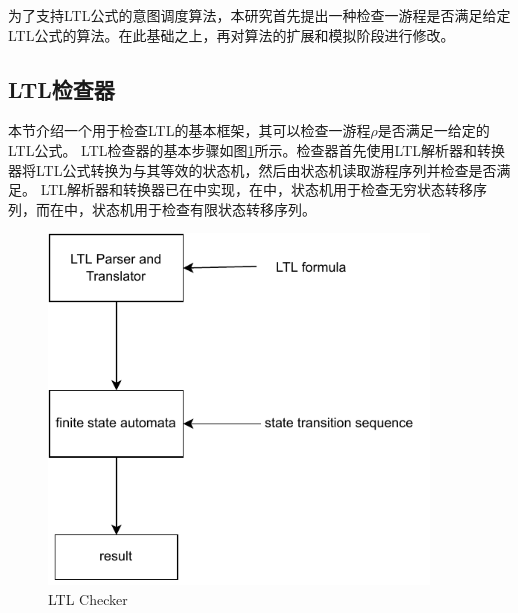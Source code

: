 为了支持LTL公式的意图调度算法，本研究首先提出一种检查一游程是否满足给定LTL公式的算法。在此基础之上，再对\SA 算法的扩展和模拟阶段进行修改。

\subsection{LTL检查器}
本节介绍一个用于检查LTL的基本框架，其可以检查一游程$\rho$是否满足一给定的LTL公式。
LTL检查器的基本步骤如图\ref{fig:translator}所示。检查器首先使用LTL解析器和转换器将LTL公式转换为与其等效的状态机，然后由状态机读取游程序列并检查是否满足。
LTL解析器和转换器已在\cite{DBLP:books/daglib/0020982,DBLP:journals/jlap/HuangC22}中实现，在\cite{DBLP:books/daglib/0020982}中，状态机用于检查无穷状态转移序列，而在\cite{DBLP:journals/jlap/HuangC22}中，状态机用于检查有限状态转移序列。

\begin{figure}[htb]
\centering
\includegraphics[width=0.9\textwidth]{./figs/translator}
\caption{LTL Checker}
\label{fig:translator}
\end{figure}

